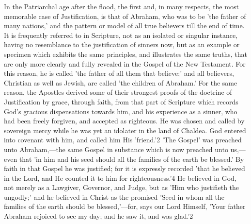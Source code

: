 \documentclass[
]{book}
\begin{document}
In the Patriarchal age after the flood, the first and, in many respects, the most memorable case of Justification, is that of Abraham, who was to be 'the father of many nations,' and the pattern or model of all true believers till the end of time. It is frequently referred to in Scripture, not as an isolated or singular instance, having no resemblance to the justification of sinners now, but as an example or specimen which exhibits the same principles, and illustrates the same truths, that are only more clearly and fully revealed in the Gospel of the New Testament. For this reason, he is called 'the father of all them that believe;' and all believers, Christian as well as Jewish, are called 'the children of Abraham.' For the same reason, the Apostles derived some of their strongest proofs of the doctrine of Justification by grace, through faith, from that part of Scripture which records God's gracious dispensations towards him, and his experience as a sinner, who had been freely forgiven, and accepted as righteous. He was chosen and called by sovereign mercy while he was yet an idolater in the land of Chaldea. God entered into covenant with him, and called him His 'friend.'2 'The Gospel' was preached unto Abraham,---the same Gospel in substance which is now preached unto us,---even that 'in him and his seed should all the families of the earth be blessed.' By faith in that Gospel he was justified; for it is expressly recorded 'that he believed in the Lord, and He counted it to him for righteousness.'4 He believed in God, not merely as a Lawgiver, Governor, and Judge, but as 'Him who justifieth the ungodly;' and he believed in Christ as the promised 'Seed in whom all the families of the earth should be blessed,'---for, says our Lord Himself, 'Your father Abraham rejoiced to see my day; and he saw it, and was glad.'2
\end{document}
